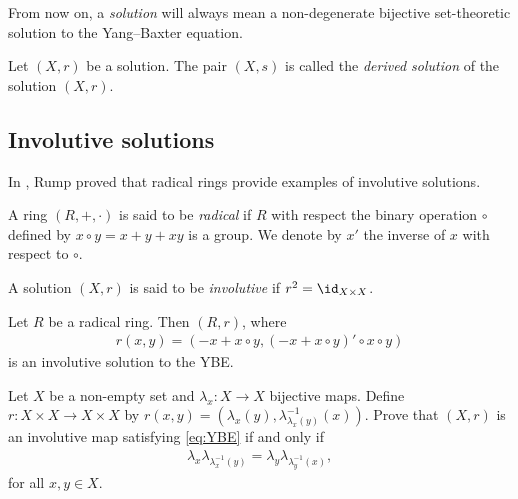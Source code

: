     \begin{convention}
        From now on, a \emph{solution}  will always mean a non-degenerate bijective set-theoretic solution to the Yang--Baxter equation.
    \end{convention}

    \begin{definition}
         Let $(X,r)$ be a solution. The pair $(X,s)$ is called the \emph{derived solution} of the solution $(X,r)$.
    \end{definition}



    \subsection{Involutive solutions}
    In \cite{MR2278047}, Rump proved that radical rings provide examples of involutive solutions.

    \begin{definition}
        A ring $(R,+,\cdot)$ is said to be \emph{radical} if $R$ with respect the binary operation $\circ$ defined by $x\circ y=x+y+xy$ is a group. We denote by $x'$ the inverse of $x$ with respect to $\circ$.  
    \end{definition}
    
    \begin{definition}
        A solution $(X,r)$ is said to be \emph{involutive} if $r^2=\id_{X\times X}$.
    \end{definition}
    
    \begin{proposition}
        Let $R$ be a radical ring. Then $(R,r)$, where 
        \begin{align}\label{eq:solradical}
            r(x, y) = (-x + x\circ y, (-x + x \circ y)'\circ x\circ y)
        \end{align}
        is an involutive solution to the YBE.
    \end{proposition}

    \begin{exercise}\label{ex:involutive}
        Let $X$ be a non-empty set and $\lambda_x:X \to X$ bijective maps. Define $r:X\times X \to X \times X$ by $r(x,y)=(\lambda_x(y),\lambda^{-1}_{\lambda_x(y)}(x))$. Prove that $(X,r)$ is an involutive map satisfying \eqref{eq:YBE} if and only if 
        \begin{align*}
            \lambda_x\lambda_{\lambda^{-1}_x(y)} =\lambda_y\lambda_{\lambda^{-1}_y(x)},
        \end{align*}
        for all $x,y\in X$.
    \end{exercise}


